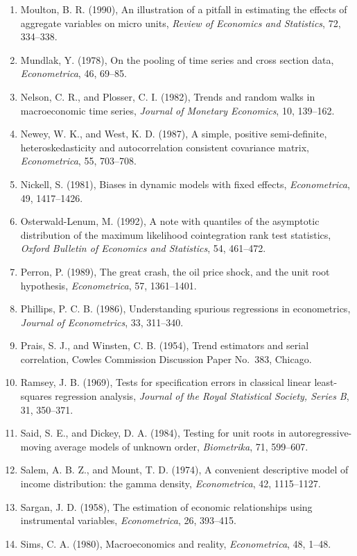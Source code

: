 \documentclass[11pt,a4paper]{article}
\numberwithin{equation}{section}
\theoremstyle{definition}
\begin{document}
\begin{enumerate}
160--217.
\item Moulton, B. R. (1990), An illustration of a pitfall in estimating the effects of aggregate variables on micro units, \emph{Review of
Economics and Statistics}, 72, 334--338.
\item Mundlak, Y. (1978), On the pooling of time series and cross section data, \emph{Econometrica}, 46, 69--85.
\item Nelson, C. R., and Plosser, C. I. (1982), Trends and random walks in macroeconomic time series, \emph{Journal of Monetary Economics}, 10,
139--162.
\item Newey, W. K., and West, K. D. (1987), A simple, positive semi-definite, heteroskedasticity and autocorrelation consistent covariance matrix,
\emph{Econometrica}, 55, 703--708.
\item Nickell, S. (1981), Biases in dynamic models with fixed effects, \emph{Econometrica}, 49, 1417--1426.
\item Osterwald-Lenum, M. (1992), A note with quantiles of the asymptotic distribution of the maximum likelihood cointegration rank test
statistics, \emph{Oxford Bulletin of Economics and Statistics}, 54, 461--472.
\item Perron, P. (1989), The great crash, the oil price shock, and the unit root hypothesis, \emph{Econometrica}, 57, 1361--1401.
\item Phillips, P. C. B. (1986), Understanding spurious regressions in econometrics, \emph{Journal of Econometrics}, 33, 311--340.
\item Prais, S. J., and Winsten, C. B. (1954), Trend estimators and serial correlation, Cowles Commission Discussion Paper No.~383, Chicago.
\item Ramsey, J. B. (1969), Tests for specification errors in classical linear least-squares regression analysis, \emph{Journal of the Royal
Statistical Society, Series B}, 31, 350--371.
\item Said, S. E., and Dickey, D. A. (1984), Testing for unit roots in autoregressive-moving average models of unknown order, \emph{Biometrika},
71, 599--607.
\item Salem, A. B. Z., and Mount, T. D. (1974), A convenient descriptive model of income distribution: the gamma density, \emph{Econometrica},
42, 1115--1127.
\item Sargan, J. D. (1958), The estimation of economic relationships using instrumental variables, \emph{Econometrica}, 26, 393--415.
\item Sims, C. A. (1980), Macroeconomics and reality, \emph{Econometrica}, 48, 1--48.

\end{enumerate}
\end{document}

